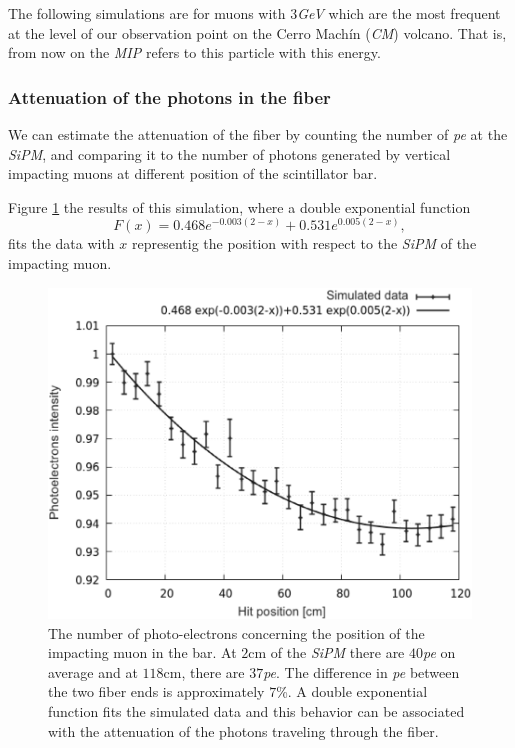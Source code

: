 \documentclass[submitting]{nst}
\begin{document}
The following simulations are for muons with $3$\textsl{GeV} which are the most frequent at the level of our observation point on the Cerro Machín (\textsl{CM}) volcano. That is, from now on the \textsl{MIP} refers to this particle with this energy.

\subsubsection{Attenuation of the photons in the fiber}%
We can estimate the attenuation of the fiber by counting the number of \textsl{pe} at the \textsl{SiPM}, and comparing it to the number of photons generated by vertical impacting muons at different position of the scintillator bar. 

Figure \ref{atenuacion_barra} the results of this simulation, where a double exponential function 
\begin{equation}
F(x)= \text{0.468} e^{-0.003(2-x)} + \text{0.531}e^{0.005(2-x)},
\end{equation}
fits the data with $x$ representig the position  with respect to the \textsl{SiPM} of the impacting muon. 
\begin{figure}[h!]
    \centering
        \includegraphics[scale=0.41]{Figures/atenuacion_barra_2.png}
   \caption{The number of photo-electrons concerning the position of the impacting muon in the bar. At $2$cm of the \textsl{SiPM} there are $40$\textsl{pe} on average and at $118$cm, there are $37$\textsl{pe}. The difference in \textsl{pe} between the two fiber ends is approximately $7$\%. A double exponential function fits the simulated data and this behavior can be associated with the attenuation of the photons traveling through the fiber.}\label{atenuacion_barra}
\end{figure}
\end{document}
